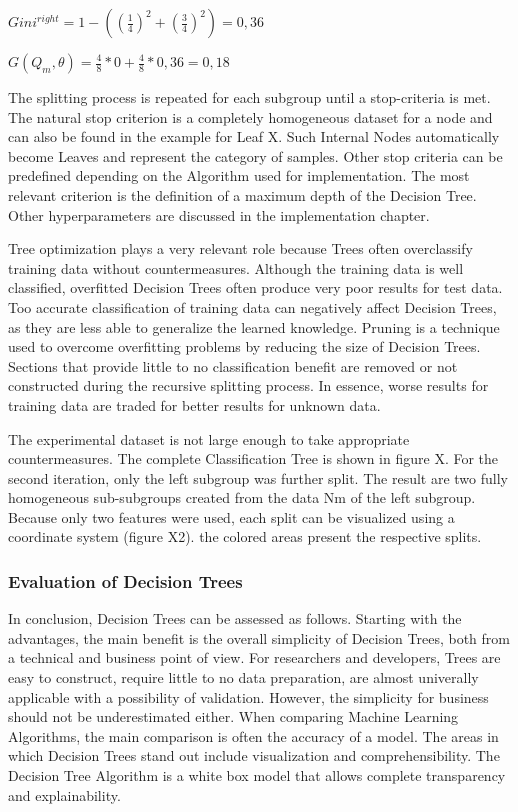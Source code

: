 \(Gini^{right} = 1 - ((\frac{1}{4})^2 + (\frac{3}{4})^2) = 0,36 \)

\(G(Q_{m},\theta) = \frac{4}{8} * 0 + \frac{4}{8} * 0,36 = 0,18 \)

The splitting process is repeated for each subgroup until a stop-criteria is met. The natural 
stop criterion is a completely homogeneous dataset for a node and can also be found in the 
example for Leaf X. Such Internal Nodes automatically become Leaves and represent the category 
of samples. Other stop criteria can be predefined depending on the Algorithm used for 
implementation. The most relevant criterion is the definition of a maximum depth of the Decision 
Tree. Other hyperparameters are discussed in the implementation chapter. 

Tree optimization plays a very relevant role because Trees often overclassify training data 
without countermeasures. Although the training data is well classified, overfitted Decision 
Trees often produce very poor results for test data. Too accurate classification of training 
data can negatively affect Decision Trees, as they are less able to generalize the learned 
knowledge. Pruning is a technique used to overcome overfitting problems by reducing the size of 
Decision Trees. Sections that provide little to no classification benefit are removed or not 
constructed during the recursive splitting process. In essence, worse results for training data 
are traded for better results for unknown data.

The experimental dataset is not large enough to take appropriate countermeasures. The complete 
Classification Tree is shown in figure X. For the second iteration, only the left subgroup was 
further split. The result are two fully homogeneous sub-subgroups created from the data Nm of the 
left subgroup. Because only two features were used, each split can be visualized using a 
coordinate system (figure X2). the colored areas present the respective splits.

\subsubsection{Evaluation of Decision Trees}

In conclusion, Decision Trees can be assessed as follows. Starting with the advantages,
the main benefit is the overall simplicity of Decision Trees, both from a technical and 
business point of view. For researchers and developers, Trees are easy to construct, require little
to no data preparation, are almost univerally applicable with a possibility of validation. 
However, the simplicity for business should not be underestimated either. When comparing Machine
Learning Algorithms, the main comparison is often the accuracy of a model. The areas in which 
Decision Trees stand out include visualization and comprehensibility. The Decision Tree Algorithm 
is a white box model that allows complete transparency and explainability. 

